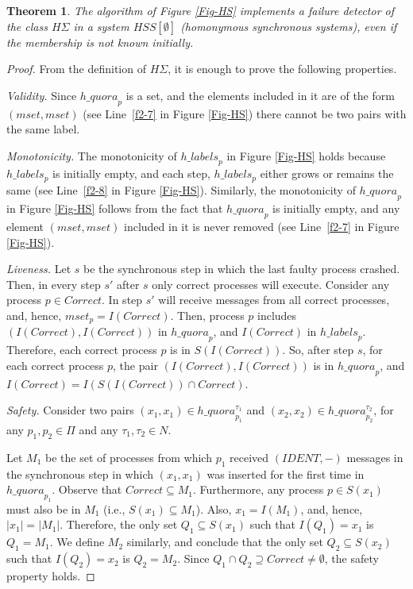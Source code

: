 \documentclass[10pt, conference, compsocconf]{IEEEtran}
\newtheorem{theorem}{Theorem}
\newcommand{\HS}{{H\Sigma}}
\newcommand{\C}{{\mathit{Correct}}}
\newcommand{\quora}{{\mathit{h\_quora}}}
\newcommand{\labels}{{\mathit{h\_labels}}}
\begin{document}
   
\begin{theorem}
The algorithm of Figure \ref{Fig-HS} implements a failure detector 
of the class ${\HS}$ in a system $\mathit{HSS}[\emptyset]$ (homonymous 
synchronous systems), even if the membership is not known initially.
\end{theorem}
\begin{proof}
From the definition of $\HS$, it is enough to prove the following properties.

\emph{Validity.}
Since $\quora_p$ is a set, and the elements included in it are of the 
form $(mset,mset)$ (see Line~\ref{f2-7} in Figure \ref{Fig-HS}) there cannot 
be two pairs with the same label.
   
\emph{Monotonicity.}
The monotonicity of $\labels_p$ in Figure \ref{Fig-HS} holds because 
$\labels_p$ is initially empty, and 
each step, $\labels_p$ either grows or remains the same 
(see Line~\ref{f2-8} in Figure \ref{Fig-HS}). 
Similarly, the monotonicity of $\quora_p$ in Figure \ref{Fig-HS} 
follows from the fact that $\quora_p$ is 
initially empty, and any element $(mset,mset)$ included in it is 
never removed (see Line~\ref{f2-7} in Figure \ref{Fig-HS}).

\emph{Liveness.}
Let $s$ be the synchronous step in which the last faulty process crashed. 
Then, in every step $s'$ after $s$ only correct processes will execute. 
Consider any process $p \in \C$. In step $s'$ will receive messages 
from all correct 
processes, and, hence, $mset_p=I(\C)$. 
Then, process $p$ includes $(I(\C),I(\C))$ in $\quora_p$, and $I(\C)$ in  
$\labels_p$. Therefore, each correct process $p$ is in $S(I(\C))$. 
So, after step $s$, for each correct process $p$, the pair $(I(\C),I(\C))$ 
is in $\quora_p$, and $I(\C)=I(S(I(\C)) \cap  \C)$. 
 
\emph{Safety.}
Consider two pairs $(x_1,x_1) \in \quora_{p_1}^{\tau_1}$ and 
$(x_2,x_2) \in \quora_{p_2}^{\tau_2}$, 
for any $p_1, p_2 \in \Pi$ and any $\tau_1, \tau_2 \in N$. 

Let $M_1$ be the set of processes from which $p_1$ received 
$(\mathit{IDENT},-)$ messages in the synchronous step in which
 $(x_1,x_1)$ was inserted for the first time in  $\quora_{p_1}$. 
Observe that $\C \subseteq M_1$. 
Furthermore, any process $p \in S(x_1)$ must also be in $M_1$ 
(i.e., $S(x_1) \subseteq M_1$). Also, $x_1=I(M_1)$, and,  
hence, $|x_1|=|M_1|$. Therefore, the only set $Q_1 \subseteq S(x_1)$ 
such that $I(Q_1)=x_1$ is $Q_1=M_1$.  We define $M_2$ similarly, 
and conclude that the only set $Q_2 \subseteq S(x_2)$ such that 
$I(Q_2)=x_2$ is $Q_2=M_2$. Since
$Q_1 \cap Q_2 \supseteq \C \not= \emptyset$, the safety property holds. 
\end{proof}
\end{document}
